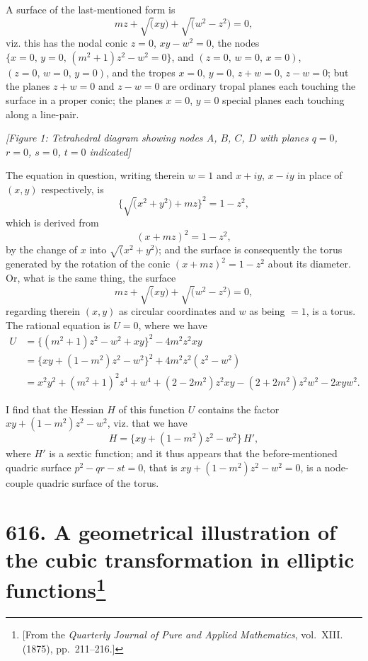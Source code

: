 \documentclass[11pt,a4paper]{article}
\theoremstyle{plain}
\theoremstyle{definition}
\theoremstyle{remark}
\begin{document}
A surface of the last-mentioned form is
\[
mz + \surd(xy) + \surd(w^2 - z^2) = 0,
\]
viz. this has the nodal conic $z = 0$, $xy - w^2 = 0$, the nodes $\{x = 0,\, y = 0,\, (m^2+1)z^2 - w^2 = 0\}$, and $(z = 0,\, w = 0,\, x = 0)$, $(z = 0,\, w = 0,\, y = 0)$, and the tropes $x = 0$, $y = 0$, $z+w = 0$, $z-w = 0$; but the planes $z+w = 0$ and $z-w = 0$ are ordinary tropal planes each touching the surface in a proper conic; the planes $x = 0$, $y = 0$ special planes each touching along a line-pair.

\begin{center}
\textit{[Figure 1: Tetrahedral diagram showing nodes $A$, $B$, $C$, $D$ with planes $q=0$, $r=0$, $s=0$, $t=0$ indicated]}
\end{center}

The equation in question, writing therein $w = 1$ and $x+iy$, $x-iy$ in place of $(x, y)$ respectively, is
\[
\{\surd(x^2+y^2) + mz\}^2 = 1 - z^2,
\]
which is derived from
\[
(x + mz)^2 = 1 - z^2,
\]
by the change of $x$ into $\surd(x^2+y^2)$; and the surface is consequently the torus generated by the rotation of the conic $(x+mz)^2 = 1-z^2$ about its diameter. Or, what is the same thing, the surface
\[
mz + \surd(xy) + \surd(w^2-z^2) = 0,
\]
regarding therein $(x, y)$ as circular coordinates and $w$ as being $= 1$, is a torus. The rational equation is $U = 0$, where we have
\begin{align*}
U &= \{(m^2+1)z^2 - w^2 + xy\}^2 - 4m^2z^2xy\\
&= \{xy + (1-m^2)z^2 - w^2\}^2 + 4m^2z^2(z^2-w^2)\\
&= x^2y^2 + (m^2+1)^2z^4 + w^4 + (2-2m^2)z^2xy - (2+2m^2)z^2w^2 - 2xyw^2.
\end{align*}

I find that the Hessian $H$ of this function $U$ contains the factor $xy + (1-m^2)z^2 - w^2$, viz. that we have
\[
H = \{xy + (1-m^2)z^2 - w^2\}\,H',
\]
where $H'$ is a sextic function; and it thus appears that the before-mentioned quadric surface $p^2 - qr - st = 0$, that is $xy + (1-m^2)z^2 - w^2 = 0$, is a node-couple quadric surface of the torus.

\newpage
\section[A geometrical illustration of the cubic transformation in elliptic functions]{\textbf{616.} A geometrical illustration of the cubic transformation in elliptic functions\footnote{[From the \textit{Quarterly Journal of Pure and Applied Mathematics}, vol.~XIII. (1875), pp.~211--216.]}}
\end{document}
